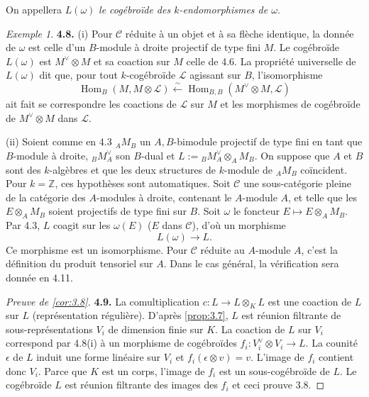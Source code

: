 \documentclass[12pt,a4paper]{article}
\theoremstyle{plain}
\theoremstyle{definition}
\theoremstyle{remark}
\newtheorem{example}[theorem]{Exemple}
\DeclareMathOperator{\Hom}{Hom}
\begin{document}
On appellera $L(\omega)$ \emph{le cogébroïde des $k$-endomorphismes de $\omega$}.

\begin{example}
\textbf{4.8.} (i) Pour $\mathcal{C}$ réduite à un objet et à sa flèche identique, la donnée de $\omega$ est celle d'un $B$-module à droite projectif de type fini $M$. Le cogébroïde $L(\omega)$ est $M^\vee \otimes M$ et sa coaction sur $M$ celle de 4.6. La propriété universelle de $L(\omega)$ dit que, pour tout $k$-cogébroïde $\mathcal{L}$ agissant sur $B$, l'isomorphisme
\[
\Hom_B(M, M \otimes \mathcal{L}) \xleftarrow{\sim} \Hom_{B,B}(M^\vee \otimes M, \mathcal{L})
\]
ait fait se correspondre les coactions de $\mathcal{L}$ sur $M$ et les morphismes de cogébroïde de $M^\vee \otimes M$ dans $\mathcal{L}$.

(ii) Soient comme en 4.3 ${}_A M_B$ un $A,B$-bimodule projectif de type fini en tant que $B$-module à droite, ${}_B M_A^\vee$ son $B$-dual et $L := {}_B M_A^\vee \otimes_A M_B$. On suppose que $A$ et $B$ sont des $k$-algèbres et que les deux structures de $k$-module de ${}_A M_B$ coïncident. Pour $k = \mathbb{Z}$, ces hypothèses sont automatiques. Soit $\mathcal{C}$ une sous-catégorie pleine de la catégorie des $A$-modules à droite, contenant le $A$-module $A$, et telle que les $E \otimes_A M_B$ soient projectifs de type fini sur $B$. Soit $\omega$ le foncteur $E \mapsto E \otimes_A M_B$. Par 4.3, $L$ coagit sur les $\omega(E)$ ($E$ dans $\mathcal{C}$), d'où un morphisme
\begin{equation}\label{eq:4.8.1}
L(\omega) \to L.
\end{equation}
Ce morphisme est un isomorphisme. Pour $\mathcal{C}$ réduite au $A$-module $A$, c'est la définition du produit tensoriel sur $A$. Dans le cas général, la vérification sera donnée en 4.11.
\end{example}

\begin{proof}[Preuve de \ref{cor:3.8}]
\textbf{4.9.} La comultiplication $c : L \to L \otimes_K L$ est une coaction de $L$ sur $L$ (représentation régulière). D'après \ref{prop:3.7}, $L$ est réunion filtrante de sous-représentations $V_i$ de dimension finie sur $K$. La coaction de $L$ sur $V_i$ correspond par 4.8(i) à un morphisme de cogébroïdes $f_i : V_i^\vee \otimes V_i \to L$. La counité $\epsilon$ de $L$ induit une forme linéaire sur $V_i$ et $f_i(\epsilon \otimes v) = v$. L'image de $f_i$ contient donc $V_i$. Parce que $K$ est un corps, l'image de $f_i$ est un sous-cogébroïde de $L$. Le cogébroïde $L$ est réunion filtrante des images des $f_i$ et ceci prouve 3.8.
\end{proof}
\end{document}
